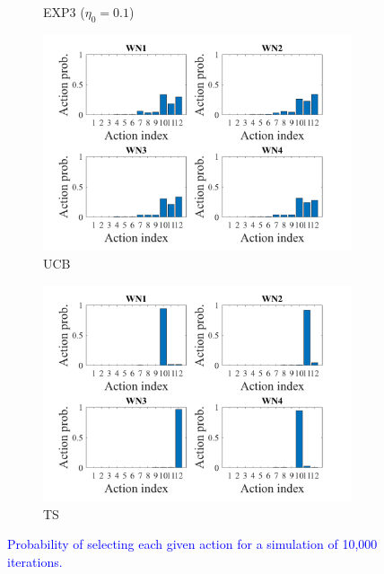 \documentclass[preprint,12pt]{elsarticle}
\begin{document}
\begin{figure}[t!]
\begin{subfigure}[b]{0.43\textwidth}
			\caption{EXP3 ($\eta_0 = 0.1$)}
			\label{fig:actions_probability_EXP3}
		\end{subfigure}
		\begin{subfigure}[b]{0.43\textwidth}
			\includegraphics[width=\textwidth]{images/actions_probability_UCB}
			\caption{UCB}
			\label{fig:actions_probability_UCB}
		\end{subfigure}
		\begin{subfigure}[b]{0.43\textwidth}
			\includegraphics[width=\textwidth]{images/actions_probability_TS}
			\caption{TS}
			\label{fig:actions_probability_TS}
		\end{subfigure}
		\caption{\textcolor{blue}{Probability of selecting each given action for a simulation of 10,000 iterations.}}
		\label{fig:actions_probabilities}
	\end{figure}
	
\end{document}
